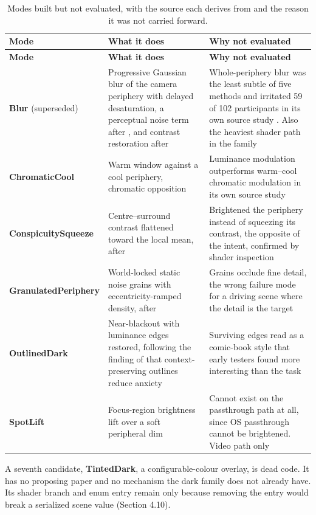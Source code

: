 \begin{longtable}{p{}|p{}|p{}}
\caption{Modes built but not evaluated, with the source each derives from and the reason it was not
carried forward.}
\label{tab:modes} \\
\hline
\textbf{Mode} & \textbf{What it does} & \textbf{Why not evaluated} \\
\hline
\endfirsthead
\hline
\textbf{Mode} & \textbf{What it does} & \textbf{Why not evaluated} \\
\hline
\endhead
\hline
\textbf{Blur} (superseded) & Progressive Gaussian blur of the camera periphery with delayed desaturation, a perceptual noise term after \citet{tariq2022}, and contrast restoration after \citet{patney2016} & Whole-periphery blur was the least subtle of five methods and irritated 59 of 102 participants in its own source study \citep{grogorick2018}. Also the heaviest shader path in the family \\
\textbf{ChromaticCool} & Warm window against a cool periphery, chromatic opposition & Luminance modulation outperforms warm–cool chromatic modulation in its own source study \citep{bailey2009} \\
\textbf{Conspicuity\-Squeeze} & Centre–surround contrast flattened toward the local mean, after \citet{veas2011} & Brightened the periphery instead of squeezing its contrast, the opposite of the intent, confirmed by shader inspection \\
\textbf{Granulated\-Periphery} & World-locked static noise grains with eccentricity-ramped density, after \citet{cao2021} & Grains occlude fine detail, the wrong failure mode for a driving scene where the detail is the target \\
\textbf{OutlinedDark} & Near-blackout with luminance edges restored, following the finding of \citet{cheng2022} that context-preserving outlines reduce anxiety & Surviving edges read as a comic-book style that early testers found more interesting than the task \\
\textbf{SpotLift} & Focus-region brightness lift over a soft peripheral dim & Cannot exist on the passthrough path at all, since OS passthrough cannot be brightened. Video path only \\
\hline
\end{longtable}

A seventh candidate, \textbf{TintedDark}, a configurable-colour overlay, is dead code. It has no
proposing paper and no mechanism the dark family does not already have. Its shader branch and enum
entry remain only because removing the entry would break a serialized scene value (Section 4.10).

